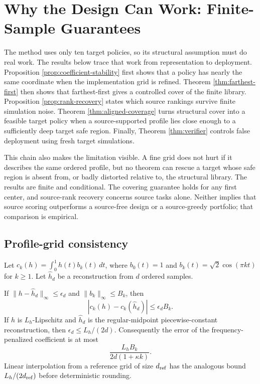 \section{Why the Design Can Work: Finite-Sample Guarantees}\label{sec:theory}

The method uses only ten target policies, so its structural assumption must do
real work.  The results below trace that work from representation to
deployment.  Proposition \ref{prop:coefficient-stability} first shows that a
policy has nearly the same coordinate when the implementation grid is
refined.  Theorem \ref{thm:farthest-first} then shows that farthest-first gives
a controlled cover of the finite library.  Proposition
\ref{prop:rank-recovery} states which source rankings survive finite
simulation noise.  Theorem \ref{thm:aligned-coverage} turns structural cover
into a feasible target policy when a source-supported profile lies close
enough to a sufficiently deep target safe region.  Finally, Theorem
\ref{thm:verifier} controls false deployment using fresh target simulations.

This chain also makes the limitation visible.  A fine grid does not hurt if it
describes the same ordered profile, but no theorem can rescue a target whose
safe region is absent from, or badly distorted relative to, the structural
library.  The results are finite and conditional.  The covering guarantee
holds for any first center, and source-rank recovery concerns source tasks
alone.  Neither implies that source scoring outperforms a source-free design
or a source-greedy portfolio; that comparison is empirical.

\subsection{Profile-grid consistency}

Let $c_k(h)=\int_0^1 h(t)b_k(t)\,dt$, where $b_0(t)=1$ and
$b_k(t)=\sqrt2\cos(\pi kt)$ for $k\ge1$.  Let $\widehat h_d$ be a reconstruction
from $d$ ordered samples.

\begin{proposition}\label{prop:coefficient-stability}
If $\|h-\widehat h_d\|_\infty\le\epsilon_d$ and
$\|b_k\|_\infty\le B_k$, then
\[
 |c_k(h)-c_k(\widehat h_d)|\le \epsilon_d B_k.
\]
If $h$ is $L_h$-Lipschitz and $\widehat h_d$ is the regular-midpoint
piecewise-constant reconstruction, then $\epsilon_d\le L_h/(2d)$.
Consequently the error of the frequency-penalized coefficient is at most
\[
 \frac{L_hB_k}{2d(1+\kappa k)}.
\]
Linear interpolation from a reference grid of size $d_{\rm ref}$ has the
analogous bound $L_h/(2d_{\rm ref})$ before deterministic rounding.
\end{proposition}

